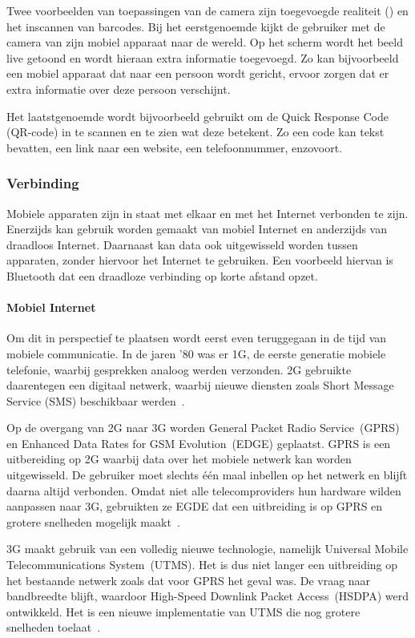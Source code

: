 Twee voorbeelden van toepassingen van de camera zijn toegevoegde realiteit () en het inscannen van barcodes.
Bij het eerstgenoemde kijkt de gebruiker met de camera van zijn mobiel apparaat naar de wereld.
Op het scherm wordt het beeld live getoond en wordt hieraan extra informatie toegevoegd.
Zo kan bijvoorbeeld een mobiel apparaat dat naar een persoon wordt gericht, ervoor zorgen dat er extra informatie over deze persoon verschijnt.

Het laatstgenoemde wordt bijvoorbeeld gebruikt om de Quick Response Code (QR-code) in te scannen en te zien wat deze betekent.
Zo een code kan tekst bevatten, een link naar een website, een telefoonnummer, enzovoort. 

\subsubsection{Verbinding}
Mobiele apparaten zijn in staat met elkaar en met het Internet verbonden te zijn.
Enerzijds kan gebruik worden gemaakt van mobiel Internet en anderzijds van draadloos Internet.
Daarnaast kan data ook uitgewisseld worden tussen apparaten, zonder hiervoor het Internet te gebruiken.
Een voorbeeld hiervan is Bluetooth dat een draadloze verbinding op korte afstand opzet.

\paragraph{Mobiel Internet}
Om dit in perspectief te plaatsen wordt eerst even teruggegaan in de tijd van mobiele communicatie.
In de jaren '80 was er 1G, de eerste generatie mobiele telefonie, waarbij gesprekken analoog werden verzonden.
2G gebruikte daarentegen een digitaal netwerk, waarbij nieuwe diensten zoals Short Message Service (SMS) beschikbaar werden~\cite{Miami2008}.

Op de overgang van 2G naar 3G worden General Packet Radio Service~(GPRS) en Enhanced Data Rates for GSM Evolution~(EDGE) geplaatst.
GPRS is een uitbereiding op 2G waarbij data over het mobiele netwerk kan worden uitgewisseld.
De gebruiker moet slechts één maal inbellen op het netwerk en blijft daarna altijd verbonden.
Omdat niet alle telecomproviders hun hardware wilden aanpassen naar 3G, gebruikten ze EGDE dat een uitbreiding is op GPRS en grotere snelheden mogelijk maakt~\cite{Lauwers2007}.

3G maakt gebruik van een volledig nieuwe technologie, namelijk Universal Mobile Telecommunications System~(UTMS).
Het is dus niet langer een uitbreiding op het bestaande netwerk zoals dat voor GPRS het geval was.
De vraag naar bandbreedte blijft, waardoor High-Speed Downlink Packet Access~(HSDPA) werd ontwikkeld. 
Het is een nieuwe implementatie van UTMS die nog grotere snelheden toelaat~\cite{Lauwers2007}.


